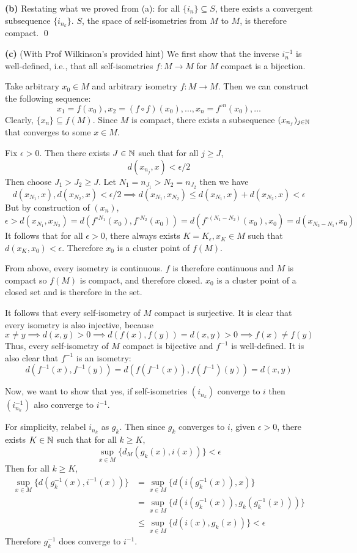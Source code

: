 \documentclass[a4paper, 12pt]{article}
\begin{document}
\begin{solution}
    \textbf{(b)} Restating what we proved from (a): for all $\{i_n\} \subseteq S$, there exists a convergent subsequence $\{i_{n_k}\}$. $S$, the space of self-isometries from $M$ to $M$, is therefore compact. \qed

    \textbf{(c)} (With Prof Wilkinson's provided hint)
    We first show that the inverse $i_n^{-1}$ is well-defined, i.e., that all self-isometries $f: M \to M$ for $M$ compact is a bijection.

    Take arbitrary $x_0 \in M$ and arbitrary isometry $f: M \to M$. Then we can construct the following sequence:
    \[
        x_1 = f(x_0), x_2 = (f \circ f)(x_0), \dots, x_n = f^{\circ n}(x_0), \dots
    \]
    Clearly, $\{x_n\} \subseteq f(M)$. Since $M$ is compact, there exists a subsequence $(x_{n_j})_{j \in \mathbb{N}}$ that converges to some $x \in M$.

    Fix $\epsilon > 0$. Then there exists $J \in \mathbb{N}$ such that for all $j \geq J$, \[
        d(x_{n_j}, x) < \epsilon/2
    \]
    Then choose $J_1 > J_2 \geq J$. Let $N_1 = n_{J_1} > N_2 = n_{J_2}$ then we have \[
        d(x_{N_1}, x), d(x_{N_2}, x) < \epsilon / 2 \implies d(x_{N_1}, x_{N_2}) \leq d(x_{N_1}, x) + d(x_{N_2}, x) < \epsilon
    \]
    But by construction of $(x_n)$, \[
        \epsilon > d(x_{N_1}, x_{N_2}) = d(f^{\circ N_1}(x_0), f^{\circ N_2}(x_0)) = d(f^{\circ (N_1 - N_2)}(x_0), x_0) = d(x_{N_2 - N_1}, x_0)
    \]
    It follows that for all $\epsilon > 0$, there always exists $K = K_\epsilon, x_K \in M$ such that $d(x_K, x_0) < \epsilon$. Therefore $x_0$ is a cluster point of $f(M)$.

    From above, every isometry is continuous. $f$ is therefore continuous and $M$ is compact so $f(M)$ is compact, and therefore closed. $x_0$ is a cluster point of a closed set and is therefore in the set.

    It follows that every self-isometry of $M$ compact is surjective. It is clear that every isometry is also injective, because \[
    x \neq y \implies d(x, y) > 0 \implies d(f(x), f(y)) = d(x, y) > 0 \implies f(x) \neq f(y)
    \]
    Thus, every self-isometry of $M$ compact is bijective and $f^{-1}$ is well-defined. It is also clear that $f^{-1}$ is an isometry: \[
    d(f^{-1}(x), f^{-1}(y)) = d(f(f^{-1}(x)), f(f^{-1})(y)) = d(x, y)
    \]

    Now, we want to show that yes, if self-isometries $(i_{n_k})$ converge to $i$ then $(i_{n_k}^{-1})$ also converge to $i^{-1}$.

    For simplicity, relabel $i_{n_k}$ as $g_k$. Then since $g_k$ converges to $i$, given $\epsilon > 0$, there exists $K \in \mathbb{N}$ such that for all $k \geq K$, \[
    \sup_{x \in M}\{d_M(g_k(x), i(x))\} < \epsilon
    \]
    Then for all $k \geq K$, \begin{align*}
    \sup_{x \in M}\{d(g_k^{-1}(x), i^{-1}(x))\} &= \sup_{x \in M}\{d(i(g_k^{-1}(x)), x) \} \\
    &= \sup_{x \in M}\{d(i(g_k^{-1}(x)), g_k(g_k^{-1}(x)))\} \\
    &\leq \sup_{x \in M}\{d(i(x), g_k(x))\} < \epsilon
    \end{align*}
    Therefore $g_k^{-1}$ does converge to $i^{-1}$.
\end{solution}
\end{document}
